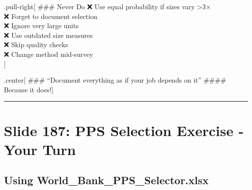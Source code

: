 \documentclass[
]{article}
\begin{document}
.pull-right{[} \#\#\# Never Do ❌ Use equal probability if sizes vary
\textgreater3×\\
❌ Forget to document selection\\
❌ Ignore very large units\\
❌ Use outdated size measures\\
❌ Skip quality checks\\
❌ Change method mid-survey\\
{]}

.center{[} \#\#\# ``Document everything as if your job depends on it''
\#\#\#\# Because it does!{]}

\begin{center}\rule{0.5\linewidth}{0.5pt}\end{center}

\section{Slide 187: PPS Selection Exercise - Your
Turn}\label{slide-187-pps-selection-exercise---your-turn}

\subsection{Using
World\_Bank\_PPS\_Selector.xlsx}\label{using-world_bank_pps_selector.xlsx}
\end{document}
